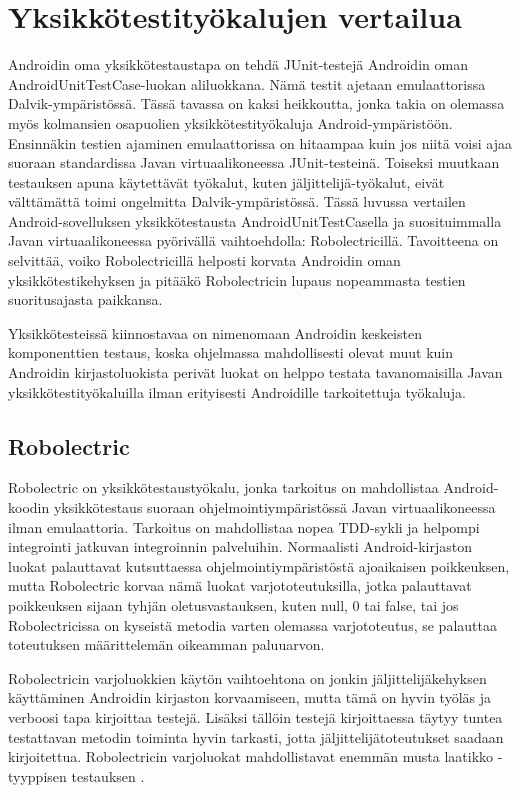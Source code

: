 \section{Yksikkötestityökalujen vertailua}

Androidin oma yksikkötestaustapa on tehdä JUnit-testejä Androidin oman AndroidUnitTestCase-luokan aliluokkana. Nämä testit ajetaan emulaattorissa Dalvik-ympäristössä. Tässä tavassa on kaksi heikkoutta, jonka takia on olemassa myös kolmansien osapuolien yksikkötestityökaluja Android-ympäristöön. Ensinnäkin testien ajaminen emulaattorissa on hitaampaa kuin jos niitä voisi ajaa suoraan standardissa Javan virtuaalikoneessa JUnit-testeinä. Toiseksi muutkaan testauksen apuna käytettävät työkalut, kuten jäljittelijä-työkalut, eivät välttämättä toimi ongelmitta Dalvik-ympäristössä. Tässä luvussa vertailen Android-sovelluksen yksikkötestausta AndroidUnitTestCasella ja suosituimmalla Javan virtuaalikoneessa pyörivällä vaihtoehdolla: Robolectricillä. Tavoitteena on selvittää, voiko Robolectricillä helposti korvata Androidin oman yksikkötestikehyksen ja pitääkö Robolectricin lupaus nopeammasta testien suoritusajasta paikkansa.

Yksikkötesteissä kiinnostavaa on nimenomaan Androidin keskeisten komponenttien testaus, koska ohjelmassa mahdollisesti olevat muut kuin Androidin kirjastoluokista perivät luokat on helppo testata tavanomaisilla Javan yksikkötestityökaluilla ilman erityisesti Androidille tarkoitettuja työkaluja.

\subsection{Robolectric}

Robolectric on yksikkötestaustyökalu, jonka tarkoitus on mahdollistaa Android-koodin yksikkötestaus suoraan ohjelmointiympäristössä Javan virtuaalikoneessa ilman emulaattoria. Tarkoitus on mahdollistaa nopea TDD-sykli ja helpompi integrointi jatkuvan integroinnin palveluihin. Normaalisti Android-kirjaston luokat palauttavat kutsuttaessa ohjelmointiympäristöstä ajoaikaisen poikkeuksen, mutta Robolectric korvaa nämä luokat varjototeutuksilla, jotka palauttavat poikkeuksen sijaan tyhjän oletusvastauksen, kuten null, 0 tai false, tai jos Robolectricissa on kyseistä metodia varten olemassa varjototeutus, se palauttaa toteutuksen määrittelemän oikeamman paluuarvon.

Robolectricin varjoluokkien käytön vaihtoehtona on jonkin jäljittelijäkehyksen käyttäminen Androidin kirjaston korvaamiseen, mutta tämä on hyvin työläs ja verboosi tapa kirjoittaa testejä. Lisäksi tällöin testejä kirjoittaessa täytyy tuntea testattavan metodin toiminta hyvin tarkasti, jotta jäljittelijätoteutukset saadaan kirjoitettua. Robolectricin varjoluokat mahdollistavat enemmän musta laatikko -tyyppisen testauksen \cite{robolectric}.

